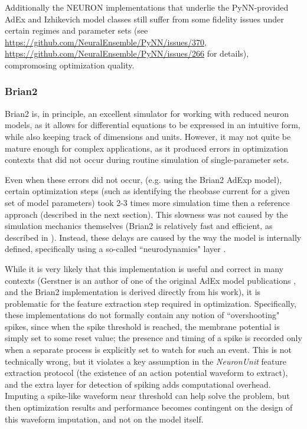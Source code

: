 
Additionally the NEURON implementations that underlie the PyNN-provided AdEx and Izhikevich model classes still suffer from some fidelity issues under certain regimes and parameter sets (see \url{https://github.com/NeuralEnsemble/PyNN/issues/370}, \url{https://github.com/NeuralEnsemble/PyNN/issues/266} for details), compromosing optimization quality.

\subsubsection{Brian2}
Brian2 \citep{stimberg2019brian} is, in principle, an excellent simulator for working with reduced neuron models, as it allows for differential equations to be expressed in an intuitive form, while also keeping track of dimensions and units.
However, it may not quite be mature enough for complex applications, as it produced errors in optimization contexts that did not occur during routine simulation of single-parameter sets.

Even when these errors did not occur, (e.g. using the Brian2 AdExp model), certain optimization steps (such as identifying the rheobase current for a given set of model parameters) took 2-3 times more simulation time then a reference approach (described in the next section).
This slowness was not caused by the simulation mechanics themselves (Brian2 is relatively fast and efficient, as described in \cite{stimberg2019brian}).
Instead, these delays are caused by the way the model is internally defined, specifically using a
so-called ``neurodynamics" layer \citep{gerstner2014neuronal}.

While it is very likely that this implementation is useful and correct in many contexts (Gerstner is an author of one of the original AdEx model publications \citep{brette2005adaptive}, and the Brian2 implementation is derived directly from his work), it is problematic for the feature extraction step required in optimization.
Specifically, these implementations do not formally contain any notion of ``overshooting" spikes, since when the spike threshold is reached, the membrane potential is simply set to some reset value; the presence and timing of a spike is recorded only when a separate process is explicitly set to watch for such an event.
This is not technically wrong, but it violates a key assumption in the \emph{NeuronUnit} feature extraction protocol (the existence of an action potential waveform to extract), and the extra layer for detection of spiking adds computational overhead.
Imputing a spike-like waveform near threshold can help solve the problem, but then optimization results and performance becomes contingent on the design of this waveform imputation, and not on the model itself.

